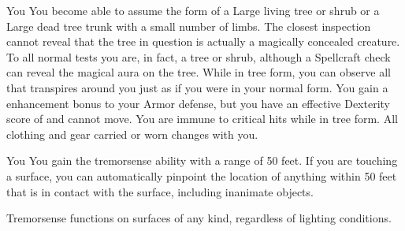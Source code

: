 \begin{spellheader}
    \spelldur{\durext \dismissable}
\end{spellheader}
\begin{spelleffects}
    \begin{spelltarget}{You}
        \spelleffect You become able to assume the form of a Large living tree or shrub or a Large dead tree trunk with a small number of limbs. The closest inspection cannot reveal that the tree in question is actually a magically concealed creature. To all normal tests you are, in fact, a tree or shrub, although a Spellcraft check can reveal the magical aura on the tree. While in tree form, you can observe all that transpires around you just as if you were in your normal form. You gain a  enhancement bonus to your Armor defense, but you have an effective Dexterity score of  and cannot move. You are immune to critical hits while in tree form. All clothing and gear carried or worn changes with you.
    \end{spelltarget}
\end{spelleffects}

\begin{spellheader}
\end{spellheader}
\begin{spelleffects}
    \begin{spelltarget}{You}
        \spelleffect You gain the tremorsense ability with a range of 50 feet. If you are touching a surface, you can automatically pinpoint the location of anything within 50 feet that is in contact with the surface, including inanimate objects.
    \end{spelltarget}
\end{spelleffects}
\begin{spellfooter}
    \spellnotes Tremorsense functions on surfaces of any kind, regardless of lighting conditions.
\end{spellfooter}

